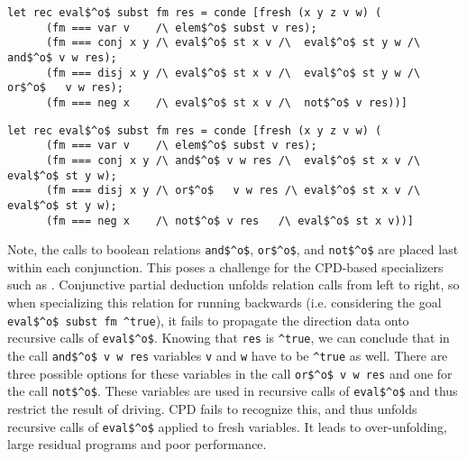 \begin{figure*}[!t]
  \centering
  \begin{minipage}{0.95\textwidth}
    \begin{lstlisting}[label={eval:last}, caption={Evaluator of formulas with boolean operation last}, captionpos=b, frame=tb]
  let rec eval$^o$ subst fm res = conde [fresh (x y z v w) (
      (fm === var v    /\ elem$^o$ subst v res);
      (fm === conj x y /\ eval$^o$ st x v /\  eval$^o$ st y w /\  and$^o$ v w res);
      (fm === disj x y /\ eval$^o$ st x v /\  eval$^o$ st y w /\  or$^o$   v w res);
      (fm === neg x    /\ eval$^o$ st x v /\  not$^o$ v res))]
    \end{lstlisting}
  \end{minipage}
  \begin{minipage}{0.95\textwidth}
    \begin{lstlisting}[label={eval:fst}, caption={Evaluator of formulas with boolean operation second}, captionpos=b, frame=tb]
  let rec eval$^o$ subst fm res = conde [fresh (x y z v w) (
      (fm === var v    /\ elem$^o$ subst v res);
      (fm === conj x y /\ and$^o$ v w res /\  eval$^o$ st x v /\  eval$^o$ st y w);
      (fm === disj x y /\ or$^o$   v w res /\ eval$^o$ st x v /\  eval$^o$ st y w);
      (fm === neg x    /\ not$^o$ v res   /\ eval$^o$ st x v))]
    \end{lstlisting}
  \end{minipage}
\end{figure*}

Note, the calls to boolean relations \lstinline{and$^o$}, \lstinline{or$^o$}, and \lstinline{not$^o$} are placed last within each conjunction.
This poses a challenge for the CPD-based specializers such as \ecce.
Conjunctive partial deduction unfolds relation calls from left to right, so when specializing this relation for running backwards (i.e. considering the goal \lstinline{eval$^o$ subst fm ^true}), it fails to propagate the direction data onto recursive calls of \lstinline{eval$^o$}.
Knowing that \lstinline{res} is \lstinline{^true}, we can conclude that in the call \lstinline{and$^o$ v w res} variables \lstinline{v} and \lstinline{w} have to be \lstinline{^true} as well.
There are three possible options for these variables in the call \lstinline{or$^o$ v w res} and one for the call \lstinline{not$^o$}.
These variables are used in recursive calls of \lstinline{eval$^o$} and thus restrict the result of driving.
CPD fails to recognize this, and thus unfolds recursive calls of \lstinline{eval$^o$} applied to fresh variables.
It leads to over-unfolding, large residual programs and poor performance.

